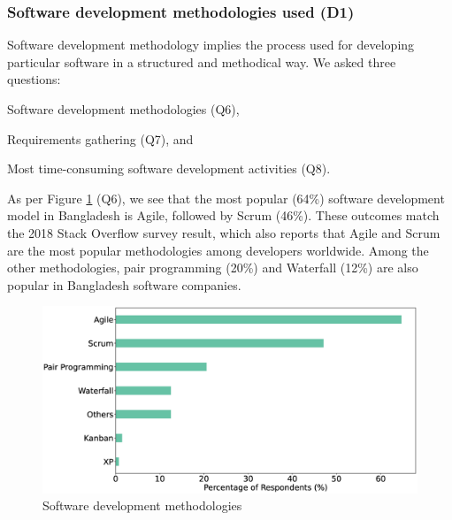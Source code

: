 \subsubsection{Software development methodologies used (D1)}
\label{methodology}

Software development methodology implies the process used for developing
particular software in a structured and methodical
way. We asked three questions: \begin{inparaenum}
\item Software development methodologies (Q6),
\item Requirements gathering (Q7), and
\item Most time-consuming software development activities (Q8).
\end{inparaenum}

As per Figure \ref{fig:methodologies} (Q6), we see
that the most popular (64\%) software development model in Bangladesh is Agile, followed by Scrum (46\%). These outcomes match the 2018 Stack Overflow
survey \cite{StackoverflowSurvey2018} result, which also reports that Agile and Scrum
are the most popular methodologies among developers worldwide. Among the other methodologies, 
pair programming (20\%) and Waterfall (12\%) are also popular in Bangladesh software companies.
\begin{figure}[h]
\centering
  \includegraphics[scale=0.18]{Figures/Respondents_Methodology}
  \caption{Software development methodologies}
  \label{fig:methodologies}
\end{figure}

